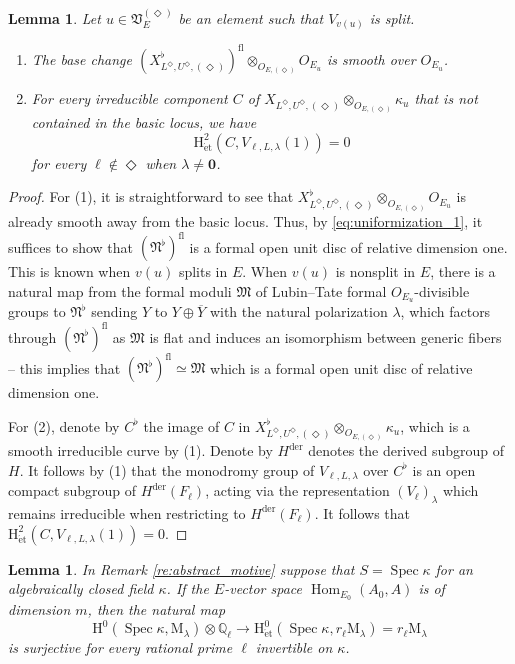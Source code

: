 \documentclass[12pt]{amsart}
\numberwithin{equation}{section}
\theoremstyle{plain}
\newtheorem{lem}[proposition]{Lemma}
\theoremstyle{definition}
\theoremstyle{remark}
\renewcommand{\b}[1]{\mathbf{#1}}
\renewcommand{\d}[1]{\mathbb{#1}}
\newcommand{\f}[1]{\mathfrak{#1}}
\renewcommand{\r}[1]{\mathrm{#1}}
\renewcommand{\(}{\left(}
\renewcommand{\)}{\right)}
\newcommand{\ol}[1]{\overline{#1}{}}
\newcommand{\dQ}{\d Q}
\newcommand{\fM}{\f M}
\newcommand{\fN}{\f N}
\newcommand{\fV}{\f V}
\newcommand{\rH}{\r H}
\newcommand{\rM}{\r M}
\newcommand{\der}{\r{der}}
\newcommand{\et}{{\acute{\r{e}}\r{t}}}
\DeclareMathOperator{\Hom}{Hom}
\DeclareMathOperator{\Spec}{Spec}
\begin{document}
\begin{lem}\label{le:vanishing_ordinary}
Let $u\in\fV_E^{(\Diamond)}$ be an element such that $V_{v(u)}$ is split.
\begin{enumerate}
  \item The base change $(X^\flat_{L^\Diamond,U^\Diamond,(\Diamond)})^{\r{fl}}\otimes_{O_{E,(\Diamond)}}O_{E_u}$ is smooth over $O_{E_u}$.

  \item For every irreducible component $C$ of $X_{L^\Diamond,U^\Diamond,(\Diamond)}\otimes_{O_{E,(\Diamond)}}\kappa_u$ that is not contained in the basic locus, we have
      \[
      \rH^2_{\et}(C,V_{\ell,L,\lambda}(1))=0
      \]
      for every $\ell\not\in\Diamond$ when $\lambda\neq\b{0}$.
\end{enumerate}
\end{lem}

\begin{proof}
For (1), it is straightforward to see that $X^\flat_{L^\Diamond,U^\Diamond,(\Diamond)}\otimes_{O_{E,(\Diamond)}}O_{E_u}$ is already smooth away from the basic locus. Thus, by \eqref{eq:uniformization_1}, it suffices to show that $(\fN^\flat)^{\r{fl}}$ is a formal open unit disc of relative dimension one. This is known when $v(u)$ splits in $E$. When $v(u)$ is nonsplit in $E$, there is a natural map from the formal moduli $\fM$ of Lubin--Tate formal $O_{E_u}$-divisible groups to $\fN^\flat$ sending $Y$ to $Y\oplus\ol{Y}$ with the natural polarization $\lambda$, which factors through $(\fN^\flat)^{\r{fl}}$ as $\fM$ is flat and induces an isomorphism between generic fibers -- this implies that $(\fN^\flat)^{\r{fl}}\simeq\fM$ which is a formal open unit disc of relative dimension one.

For (2), denote by $C^\flat$ the image of $C$ in $X^\flat_{L^\Diamond,U^\Diamond,(\Diamond)}\otimes_{O_{E,(\Diamond)}}\kappa_u$, which is a smooth irreducible curve by (1). Denote by $H^\der$ denotes the derived subgroup of $H$. It follows by (1) that the monodromy group of $V_{\ell,L,\lambda}$ over $C^\flat$ is an open compact subgroup of $H^\der(F_\ell)$, acting via the representation $(V_\ell)_\lambda$ which remains irreducible when restricting to $H^\der(F_\ell)$. It follows that $\rH^2_{\et}(C,V_{\ell,L,\lambda}(1))=0$.
\end{proof}






\begin{lem}\label{le:abstract_motive}
In Remark \ref{re:abstract_motive} suppose that $S=\Spec\kappa$ for an algebraically closed field $\kappa$. If the $E$-vector space $\Hom_{E_0}(A_0,A)$ is of dimension $m$, then the natural map
\[
\rH^0(\Spec\kappa,\rM_\lambda)\otimes\dQ_\ell\to\rH^0_\et(\Spec\kappa,r_\ell\rM_\lambda)=r_\ell\rM_\lambda
\]
is surjective for every rational prime $\ell$ invertible on $\kappa$.
\end{lem}
\end{document}
